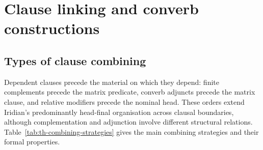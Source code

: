 \chapter{Clause linking and converb constructions}\label{ch:clause-linking}\label{ch:complex}

\section{Types of clause combining}
\label{sec:th-complex-overview}

Dependent clauses precede the material on which they depend: finite
complements precede the matrix predicate, converb adjuncts precede the matrix
clause, and relative modifiers precede the nominal head. These orders extend
Iridian's predominantly head-final organisation across clausal boundaries,
although complementation and adjunction involve different structural relations.
Table~\ref{tab:th-combining-strategies} gives the main combining strategies and
their formal properties.

